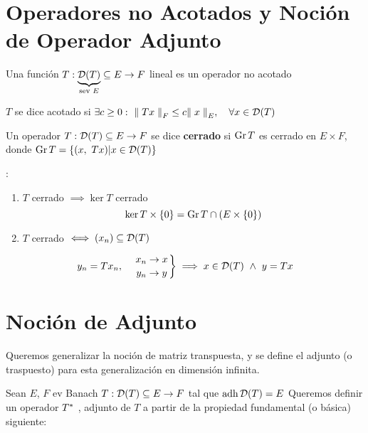 
\renewcommand{\catnum}{\theNPclase \ No Presencial}%
\renewcommand{\fecha}{14 de abril de 2020}


\section*{Operadores no Acotados y Noción de Operador Adjunto}

\begin{defn}
Una función $T: \underbrace{\mathcal{D}(T)}_{\text{sev $E$}}  \subseteq E \to F$ lineal es un operador no acotado
\end{defn}

\begin{defn}
$T$ se dice acotado si $\exists c \geq 0 :\ \norm[F]{Tx} \leq c \norm[E]{x}, \quad \forall x \in \cd(T)$
\end{defn}

\begin{defn}
Un operador  $T: \mathcal{D}(T)  \subseteq E \to F$ se dice \textbf{cerrado} si $\operatorname{\mathop{\text{\upshape{Gr}}}} T$ es cerrado en $E \times F$, donde $\operatorname{\mathop{\text{\upshape{Gr}}}} T = \{ (x,\ Tx) | x \in \mathcal{D}(T) \}$
\end{defn}

\begin{note}: 
\begin{enumerate}[(1)]
    \item $T$ cerrado $\implies \ker T$  cerrado $$\ker T \times \{ 0 \} = \operatorname{\mathop{\text{\upshape{Gr}}}} T \cap (E \times \{ 0 \})$$
    
    \item$T$ cerrado $\iff (x_n) \subseteq \mathcal{D}(T)$
\end{enumerate}
$$y_n = T x_n , \quad 
\left.
x_n \to x \atop
y_n \to y
\right \} \implies x \in \mathcal{D}(T) \ \wedge \ y = T x$$
\end{note}

\section{Noción de Adjunto}

Queremos generalizar la noción de matriz transpuesta, y se define el adjunto (o traspuesto) para esta generalización en dimensión infinita.

Sean $E$, $F$ ev Banach
$T : \mathcal{D}(T) \subseteq E \to F$ tal que $\operatorname{\mathop{\text{\upshape{adh}}}} \mathcal{D}(T) = E$
Queremos definir un operador $T^{*}$ , adjunto de $T$ a partir de la propiedad fundamental (o básica) siguiente:


